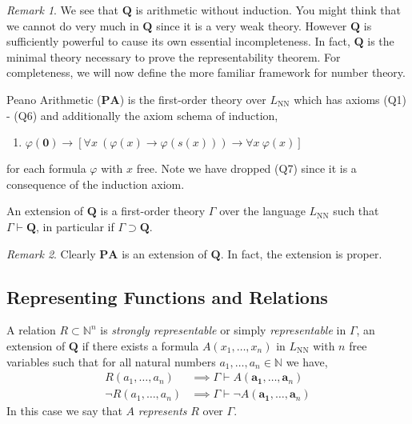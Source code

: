 \documentclass[12pt, leqno]{article}
\newcommand{\N}{\mathbb{N}}
\renewcommand{\bf}[1]{\mathbf{#1}}
\newcommand{\proves}{\vdash}
\newcommand{\uq}[1]{\forall{#1} \:}
\newenvironment{definition}[1][Definition:]{\begin{trivlist}
\item[\hskip \labelsep {\bfseries #1}]}{\end{trivlist}}
\theoremstyle{theorem}
\theoremstyle{definition}
\theoremstyle{definition}
\theoremstyle{remark}
\theoremstyle{definition}
\theoremstyle{remark}
\newtheorem{remark}{Remark}[subsection]
\begin{document}
\begin{remark}
We see that $\bf{Q}$ is arithmetic without induction. You might think that we cannot do very much in $\bf{Q}$ since it is a very weak theory. However $\bf{Q}$ is sufficiently powerful to cause its own essential incompleteness. In fact, $\bf{Q}$ is the minimal theory necessary to prove the representability theorem. For completeness, we will now define the more familiar framework for number theory.
\end{remark}

\begin{definition}
Peano Arithmetic ($\bf{PA}$) is the first-order theory over $L_{\text{NN}}$ which has axioms (Q1) - (Q6) and additionally the axiom schema of induction,
\begin{enumerate}
\item[(PA)] $\varphi(\bf{0}) \to [\uq{x} (\varphi(x) \to \varphi(s(x))) \to \uq{x} \varphi(x)]$
\end{enumerate}
for each formula $\varphi$ with $x$ free. Note we have dropped (Q7) since it is a consequence of the induction axiom. 
\end{definition}

\begin{definition}
An extension of $\bf{Q}$ is a first-order theory $\Gamma$ over the language $L_{\text{NN}}$ such that $\Gamma \proves \bf{Q}$, in particular if $\Gamma \supset \bf{Q}$. 
\end{definition}

\begin{remark}
Clearly $\bf{PA}$ is an extension of $\bf{Q}$. In fact, the extension is proper.
\end{remark}

\subsection{Representing Functions and Relations}

\begin{definition}
A relation $R \subset \N^n$ is \textit{strongly representable} or simply \textit{representable} in $\Gamma$, an extension of $\bf{Q}$ if there exists a formula $A(x_1, \dots, x_n)$ in $L_{\text{NN}}$ with $n$ free variables such that for all natural numbers $a_1, \dots, a_n \in \N$ we have,
\begin{align*}
R(a_1, \dots, a_n) & \implies \Gamma \proves A(\bf{a_1}, \dots, \bf{a}_n)
\\
\neg R(a_1, \dots, a_n) & \implies \Gamma \proves \neg A(\bf{a_1}, \dots, \bf{a}_n)
\end{align*}
In this case we say that $A$ \textit{represents} $R$ over $\Gamma$.
\end{definition}
\end{document}
